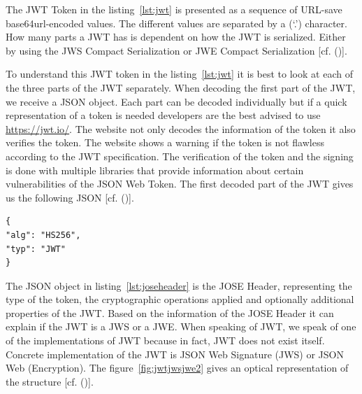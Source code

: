 The JWT Token in the listing~\ref{lst:jwt} is presented as a sequence of URL-save base64url-encoded values. The different values are separated by a (‘.’) character. How many parts a JWT has is dependent on how the JWT is serialized. Either by using the JWS Compact Serialization or JWE Compact Serialization [cf. (\cite{JWT:IETF:Jones:2015})].


To understand this JWT token in the listing~\ref{lst:jwt} it is best to look at each of the three parts of the JWT separately. When decoding the first part of the JWT, we receive a JSON object. Each part can be decoded individually but if a quick representation of a token is needed developers are the best advised to use \href{https://jwt.io/} {https://jwt.io/}. The website not only decodes the information of the token it also verifies the token. The website shows a warning if the token is not flawless according to the JWT specification. The verification of the token and the signing is done with multiple libraries that provide information about certain vulnerabilities of the JSON Web Token. The first decoded part of the JWT gives us the following JSON [cf. (\cite{JWT:IETF:Jones:2015})].


\begin{lstlisting}
{
"alg": "HS256",
"typ": "JWT"
}
\end{lstlisting}


The JSON object in listing~\ref{lst:joseheader} is the JOSE Header, representing the type of the token, the cryptographic operations applied and optionally additional properties of the JWT. Based on the information of the JOSE Header it can explain if the JWT is a JWS or a JWE. When speaking of JWT, we speak of one of the implementations of JWT because in fact, JWT does not exist itself. Concrete implementation of the JWT is JSON Web Signature (JWS) or JSON Web (Encryption). The figure~\ref{fig:jwtjwsjwe2} gives an optical representation of the structure [cf. (\cite{Siriwardena:JWTJWSJWE:2016})].



